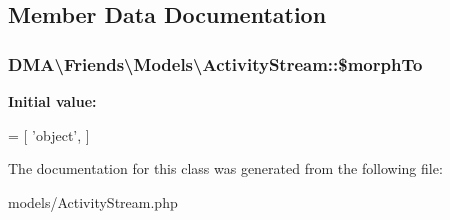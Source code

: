 

\subsection{Member Data Documentation}
\hypertarget{classDMA_1_1Friends_1_1Models_1_1ActivityStream_aaf821c5d74ad84ec4c4a98d4bb861e74}{
\subsubsection[{\$morph\+To}]{\setlength{\rightskip}{0pt plus 5cm}D\+M\+A\textbackslash{}\+Friends\textbackslash{}\+Models\textbackslash{}\+Activity\+Stream\+::\$morph\+To}}\label{classDMA_1_1Friends_1_1Models_1_1ActivityStream_aaf821c5d74ad84ec4c4a98d4bb861e74}
{\bfseries Initial value\+:}
\begin{DoxyCode}
= [
        \textcolor{stringliteral}{'object'},
    ]
\end{DoxyCode}


The documentation for this class was generated from the following file\+:\begin{DoxyCompactItemize}
\item 
models/Activity\+Stream.\+php\end{DoxyCompactItemize}
